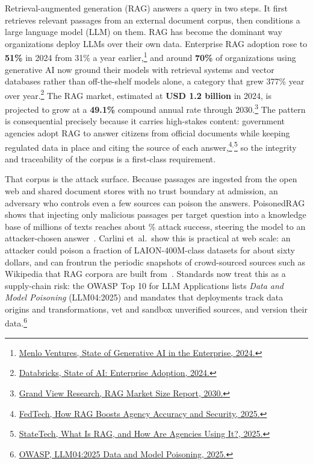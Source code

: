 \documentclass[12pt]{article}
\begin{document}
Retrieval-augmented generation (RAG) answers a query in two steps. It first
retrieves relevant passages from an external document corpus, then conditions a
large language model (LLM) on them. RAG has become the dominant way organizations
deploy LLMs over their own data. Enterprise RAG adoption rose to
\textbf{51\%} in 2024 from 31\% a year
earlier,\footnote{\href{https://menlovc.com/2024-the-state-of-generative-ai-in-the-enterprise/}{Menlo
Ventures, State of Generative AI in the Enterprise, 2024.}} and
around \textbf{70\%} of organizations using generative AI now ground their
models with retrieval systems and vector databases rather than off-the-shelf
models alone, a category that grew 377\% year over
year.\footnote{\href{https://www.databricks.com/blog/state-ai-enterprise-adoption-growth-trends}{Databricks,
State of AI: Enterprise Adoption, 2024.}} The RAG market,
estimated at \textbf{USD 1.2 billion} in 2024, is projected to grow at a
\textbf{49.1\%} compound annual rate through
2030.\footnote{\href{https://www.grandviewresearch.com/industry-analysis/retrieval-augmented-generation-rag-market-report}{Grand
View Research, RAG Market Size Report, 2030.}}
The pattern is consequential precisely because it carries high-stakes content:
government agencies adopt RAG to answer citizens from official documents while
keeping regulated data in place and citing the source of each
answer,\footnote{\href{https://fedtechmagazine.com/article/2025/05/how-rag-boosts-agency-accuracy-security-perfcon}{FedTech,
How RAG Boosts Agency Accuracy and Security, 2025.}}$^{,}$\footnote{\href{https://statetechmagazine.com/article/2025/02/what-is-rag-perfcon}{StateTech,
What Is RAG, and How Are Agencies Using It?, 2025.}} so the integrity and traceability of the corpus is a
first-class requirement.

That corpus is the attack surface. Because passages are ingested from the open
web and shared document stores with no trust boundary at admission, an adversary
who controls even a few sources can poison the answers. PoisonedRAG shows that
injecting only \PoisonTexts{} malicious passages per target question into a
knowledge base of millions of texts reaches about \PoisonASR\% attack success,
steering the model to an attacker-chosen answer~\cite{poisonedrag}. Carlini
et~al.\ show this is practical at web scale: an attacker could poison a fraction
of LAION-400M-class datasets for about sixty dollars, and can frontrun the
periodic snapshots of crowd-sourced sources such as Wikipedia that RAG corpora
are built from~\cite{carlini}. Standards now treat this as a supply-chain risk:
the OWASP Top 10 for LLM Applications lists \emph{Data and Model Poisoning}
(LLM04:2025) and mandates that deployments track data origins and
transformations, vet and sandbox unverified sources, and version their
data.\footnote{\href{https://github.com/OWASP/www-project-top-10-for-large-language-model-applications/blob/main/2_0_vulns/LLM04_DataModelPoisoning.md}{OWASP,
LLM04:2025 Data and Model Poisoning, 2025.}}
\end{document}

